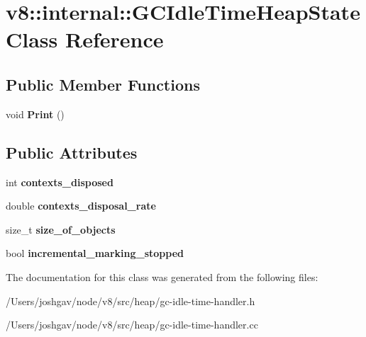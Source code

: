 \hypertarget{classv8_1_1internal_1_1_g_c_idle_time_heap_state}{}\section{v8\+:\+:internal\+:\+:G\+C\+Idle\+Time\+Heap\+State Class Reference}
\label{classv8_1_1internal_1_1_g_c_idle_time_heap_state}
\subsection*{Public Member Functions}
\begin{DoxyCompactItemize}
\item 
void {\bfseries Print} ()\hypertarget{classv8_1_1internal_1_1_g_c_idle_time_heap_state_a80304be0fc23adca8ea87871a5dcd03b}{}\label{classv8_1_1internal_1_1_g_c_idle_time_heap_state_a80304be0fc23adca8ea87871a5dcd03b}

\end{DoxyCompactItemize}
\subsection*{Public Attributes}
\begin{DoxyCompactItemize}
\item 
int {\bfseries contexts\+\_\+disposed}\hypertarget{classv8_1_1internal_1_1_g_c_idle_time_heap_state_a0524bdd0064e202bc0f66888cdfbc86d}{}\label{classv8_1_1internal_1_1_g_c_idle_time_heap_state_a0524bdd0064e202bc0f66888cdfbc86d}

\item 
double {\bfseries contexts\+\_\+disposal\+\_\+rate}\hypertarget{classv8_1_1internal_1_1_g_c_idle_time_heap_state_a41d8651b1cebaf14a73f8458207842d9}{}\label{classv8_1_1internal_1_1_g_c_idle_time_heap_state_a41d8651b1cebaf14a73f8458207842d9}

\item 
size\+\_\+t {\bfseries size\+\_\+of\+\_\+objects}\hypertarget{classv8_1_1internal_1_1_g_c_idle_time_heap_state_a66c1b77d6b17a21b6a1313072869ad57}{}\label{classv8_1_1internal_1_1_g_c_idle_time_heap_state_a66c1b77d6b17a21b6a1313072869ad57}

\item 
bool {\bfseries incremental\+\_\+marking\+\_\+stopped}\hypertarget{classv8_1_1internal_1_1_g_c_idle_time_heap_state_a8ce1ab37ddce82d89432cb049ae119ab}{}\label{classv8_1_1internal_1_1_g_c_idle_time_heap_state_a8ce1ab37ddce82d89432cb049ae119ab}

\end{DoxyCompactItemize}


The documentation for this class was generated from the following files\+:\begin{DoxyCompactItemize}
\item 
/\+Users/joshgav/node/v8/src/heap/gc-\/idle-\/time-\/handler.\+h\item 
/\+Users/joshgav/node/v8/src/heap/gc-\/idle-\/time-\/handler.\+cc\end{DoxyCompactItemize}
